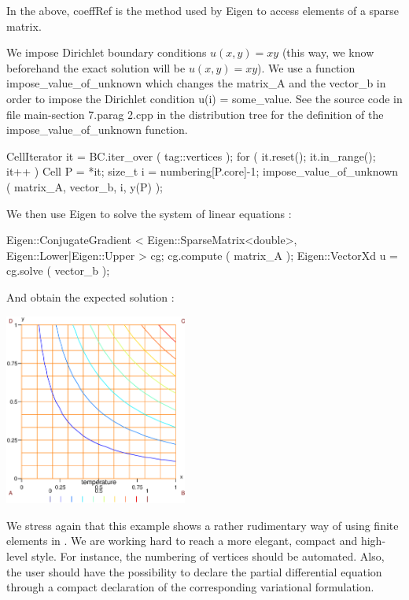 In the above, {\codett coeffRef} is the method used by {\codett Eigen} to access elements of
a sparse matrix.

We impose Dirichlet boundary conditions $ u(x,y) = xy $ (this way, we know beforehand
the exact solution will be $ u(x,y) = xy $).
We use a function {\codett impose\_value\_of\_unknown} which changes the {\codett matrix\_A}
and the {\codett vector\_b} in order to impose the Dirichlet condition {\codett u(i) = 
some\_value}. See the source code in file {\codett main-\numb section 7.\numb parag 2.cpp}
in the distribution tree for the definition of the {\codett impose\_value\_of\_unknown}
function.

\verbatim
   CellIterator it = BC.iter_over ( tag::vertices );
   for ( it.reset(); it.in_range(); it++ )
   {   Cell P = *it;
       size_t i = numbering[P.core]-1;
       impose_value_of_unknown ( matrix_A, vector_b, i, y(P) );  }
\endverbatim

We then use {\codett Eigen} to solve the system of linear equations :

\verbatim
   Eigen::ConjugateGradient < Eigen::SparseMatrix<double>,
                              Eigen::Lower|Eigen::Upper    > cg;
   cg.compute ( matrix_A );
   Eigen::VectorXd u = cg.solve ( vector_b );
\endverbatim

And obtain the expected solution :

\bigskip
{ 
\centerline{\includegraphics[width=60mm]{square-Dirichlet.eps}} }

We stress again that this example shows a rather rudimentary way of using finite elements in
\maniFEM.
We are working hard to reach a more elegant, compact and high-level style.
For instance, the numbering of vertices should be automated.
Also, the user should have the possibility to declare the partial differential equation
through a compact declaration of the corresponding variational formulation.

